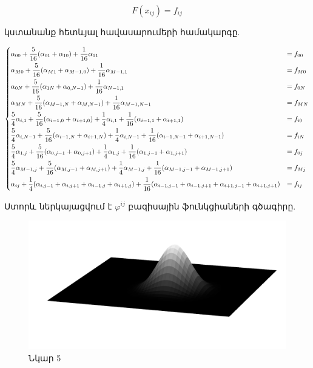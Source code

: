\documentclass[fleqn, bachelor,subf,12pt,notitlepage]{disser}
\begin{document}
				$$F(x_{ij}) = f_{ij}$$

\noindent կստանանք հետևյալ հավասարումերի համակարգը.
 
$$\begin{dcases}
\alpha_{00}+\frac{5}{16}(\alpha_{01} + \alpha_{10}) +\frac{1}{16}\alpha_{11} &= f_{00}\\
\alpha_{M0}+\frac{5}{16}(\alpha_{M1} + \alpha_{M-1,0}) +\frac{1}{16}\alpha_{M-1, 1} &= f_{M0}\\
\alpha_{0N}+\frac{5}{16}(\alpha_{1N} + \alpha_{0,N-1}) +\frac{1}{16}\alpha_{N-1, 1} &= f_{0N}\\
\alpha_{MN}+\frac{5}{16}(\alpha_{M-1,N} + \alpha_{M,N-1}) +\frac{1}{16}\alpha_{M-1,N-1} &= f_{MN}\\
\frac{5}{4}\alpha_{i,1}+\frac{5}{16}(\alpha_{i-1,0} + \alpha_{i+1,0}) +\frac{1}{4}\alpha_{i,1} + \frac{1}{16}(\alpha_{i-1,1}+\alpha_{i+1,1}) &= f_{i0}\\
\frac{5}{4}\alpha_{i,N-1}+\frac{5}{16}(\alpha_{i-1,N} + \alpha_{i+1,N}) +\frac{1}{4}\alpha_{i,N-1} + \frac{1}{16}(\alpha_{i-1,N-1}+\alpha_{i+1,N-1}) &= f_{iN}\\
\frac{5}{4}\alpha_{1,j}+\frac{5}{16}(\alpha_{0,j-1} + \alpha_{0,j+1}) +\frac{1}{4}\alpha_{1,j} + \frac{1}{16}(\alpha_{1,j-1}+\alpha_{1,j+1}) &= f_{0j}\\
\frac{5}{4}\alpha_{M-1,j}+\frac{5}{16}(\alpha_{M,j-1} + \alpha_{M,j+1}) +\frac{1}{4}\alpha_{M-1,j} + \frac{1}{16}(\alpha_{M-1,j-1}+\alpha_{M-1,j+1})& = f_{Mj}\\
\alpha_{ij} + \frac{1}{4}(\alpha_{i,j-1} + \alpha_{i,j+1} + \alpha_{i-1,j} + \alpha_{i+1,j}) + \frac{1}{16}(\alpha_{i-1,j-1} + \alpha_{i-1,j+1} + \alpha_{i+1,j-1} +\alpha_{i+1,j+1}) &= f_{ij}
\end{dcases}$$

\newpage
Ստորև ներկայացվում է $\varphi^{ij}$ բազիսային ֆունկցիաների գծագիրը.

\begin{figure}[h!]
\centering
\includegraphics[width=1.0\textwidth]{images/two_dimensional_basis}
\captionsetup{labelformat=empty}
\caption{\hfill Նկար 5}
\end{figure}
\end{document}
